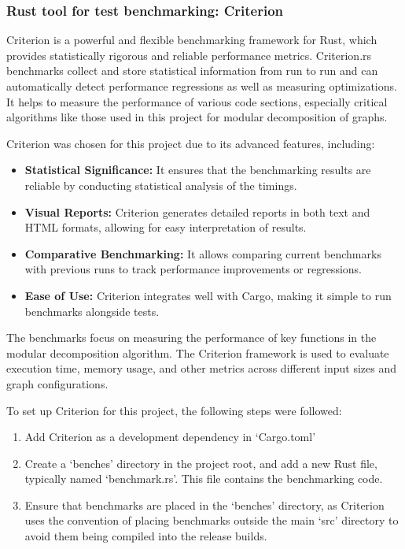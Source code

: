 \subsubsection{Rust tool for test benchmarking: Criterion}

Criterion\cite{criterion} is a powerful and flexible benchmarking framework for Rust, which provides statistically rigorous and reliable performance metrics.
Criterion.rs benchmarks collect and store statistical information from run to run and can automatically detect performance regressions as well as measuring optimizations.
It helps to measure the performance of various code sections, especially critical algorithms like those used in this project for modular decomposition of graphs.

Criterion was chosen for this project due to its advanced features, including:
\begin{itemize}
    \item \textbf{Statistical Significance:} It ensures that the benchmarking results are reliable by conducting statistical analysis of the timings.
    \item \textbf{Visual Reports:} Criterion generates detailed reports in both text and HTML formats, allowing for easy interpretation of results.
    \item \textbf{Comparative Benchmarking:} It allows comparing current benchmarks with previous runs to track performance improvements or regressions.
    \item \textbf{Ease of Use:} Criterion integrates well with Cargo, making it simple to run benchmarks alongside tests.
\end{itemize}

The benchmarks focus on measuring the performance of key functions in the modular decomposition algorithm.
The Criterion framework is used to evaluate execution time, memory usage, and other metrics across different input sizes and graph configurations.

To set up Criterion for this project, the following steps were followed:
\begin{enumerate}
    \item Add Criterion as a development dependency in `Cargo.toml'
    \item  Create a `benches' directory in the project root, and add a new Rust file, typically named `benchmark.rs'.
    This file contains the benchmarking code.
    \item Ensure that benchmarks are placed in the `benches' directory, as Criterion uses the convention of placing benchmarks outside the main `src' directory to avoid them being compiled into the release builds.
\end{enumerate}

